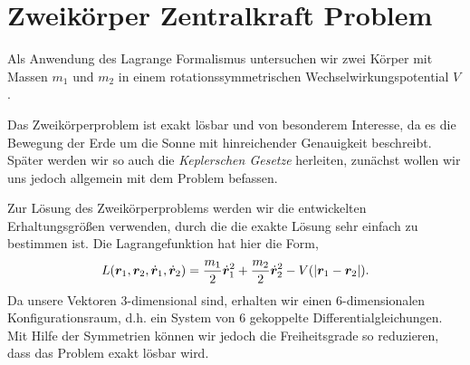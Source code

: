 \section{Zweikörper Zentralkraft Problem}
Als Anwendung des Lagrange Formalismus untersuchen wir zwei Körper mit Massen
$m_1$ und $m_2$ in einem rotationssymmetrischen Wechselwirkungspotential $V$.

Das Zweikörperproblem ist exakt lösbar und von besonderem Interesse, da es die
Bewegung der Erde um die Sonne mit hinreichender Genauigkeit beschreibt.
Später werden wir so auch die \emph{Keplerschen Gesetze} herleiten, zunächst
wollen wir uns jedoch allgemein mit dem Problem befassen.

Zur Lösung des Zweikörperproblems werden wir die entwickelten Erhaltungsgrößen
verwenden, durch die die exakte Lösung sehr einfach zu bestimmen ist. Die
Lagrangefunktion hat hier die Form,
\begin{align*}
L(\bm{r}_1,\bm{r}_2,\dot{\bm{r}}_1,\dot{\bm{r}}_2) = \frac{m_1}{2}\dot{\bm{r}}_1^2 +
\frac{m_2}{2}\dot{\bm{r}}_2^2 - V(\left|\bm{r}_1-\bm{r}_2\right|).
\end{align*}
Da unsere Vektoren 3-dimensional sind, erhalten wir einen 6-dimensionalen
Konfigurationsraum, d.h. ein System von 6 gekoppelte Differentialgleichungen.
Mit Hilfe der Symmetrien können wir jedoch die Freiheitsgrade so reduzieren,
dass das Problem exakt lösbar wird.

